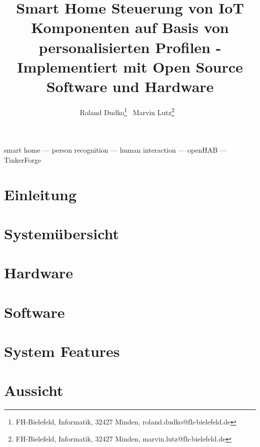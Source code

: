 \documentclass{lni}
\author{Roland Dudko\footnote{FH-Bielefeld, Informatik, 32427 Minden, roland.dudko@fh-bielefeld.de} \,
        Marvin Lutz\footnote{FH-Bielefeld, Informatik, 32427 Minden, marvin.lutz@fh-bielefeld.de} \ }
\title{Smart Home Steuerung von IoT Komponenten auf Basis von personalisierten Profilen - Implementiert mit Open Source Software und Hardware}
\renewcommand{\headrulewidth}{0.4pt} %
\begin{document}
\maketitle
\renewcommand{\refname}{Literaturverzeichnis}
\setcounter{footnote}{2} %

\begin{abstract}

\end{abstract}
\begin{keywords}
smart home --- person recognition --- human interaction --- openHAB --- TinkerForge
\end{keywords}

\section{Einleitung}


\pagestyle{fancy}
\fancyhead{} %
\fancyfoot{} %
\renewcommand{\headrulewidth}{0.4pt} %


\section{Systemübersicht}


\section{Hardware}


\section{Software}


\section{System Features}


\section{Aussicht}




\end{document}
